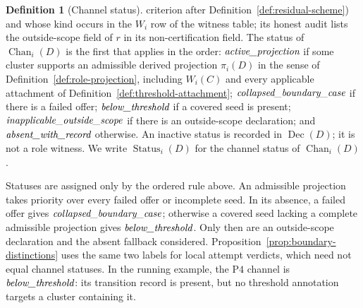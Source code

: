 \documentclass[11pt]{article}
\theoremstyle{definition}
\newtheorem{definition}[theorem]{Definition}
\newcommand{\Dec}[1]{\ensuremath{\operatorname{Dec}\!\left(#1\right)}}
\newcommand{\Chan}[2]{\ensuremath{\operatorname{Chan}_{#1}\!\left(#2\right)}}
\newcommand{\Status}[2]{\ensuremath{\operatorname{Status}_{#1}\!\left(#2\right)}}
\newcommand{\activeproj}{\textit{active\_\allowbreak projection}}
\newcommand{\belowthr}{\textit{below\_\allowbreak threshold}}
\newcommand{\collapsedbc}{\textit{collapsed\_\allowbreak boundary\_\allowbreak case}}
\newcommand{\absentrec}{\textit{absent\_\allowbreak with\_\allowbreak record}}
\newcommand{\outsidescope}{\textit{inapplicable\_\allowbreak outside\_\allowbreak scope}}
\newcommand{\Pfour}{\ensuremath{\mathrm{P4}}}
\begin{document}
\begin{definition}[Channel status]
criterion after Definition~\ref{def:residual-scheme}) and whose kind occurs in
the \(W_i\) row of the witness table; its honest audit lists the
outside-scope field of \(r\) in its non-certification field. The status of \(\Chan{i}{D}\) is the
first that applies in the order: \(\activeproj\) if some cluster supports
an admissible derived projection \(\pi_i(D)\) in the sense of
Definition~\ref{def:role-projection}, including \(W_i(C)\) and every
applicable attachment of Definition~\ref{def:threshold-attachment}; \(\collapsedbc\) if there is a
failed offer; \(\belowthr\) if a covered seed is present;
\(\outsidescope\) if there is an outside-scope declaration; and
\(\absentrec\) otherwise. An inactive status is recorded in \(\Dec{D}\); it
is not a role witness. We write \(\Status{i}{D}\) for the channel status of
\(\Chan{i}{D}\).
\end{definition}

Statuses are assigned only by the ordered rule above. An admissible
projection takes priority over every failed offer or incomplete seed. In its
absence, a failed offer gives \(\collapsedbc\); otherwise a covered seed
lacking a complete admissible projection gives \(\belowthr\). Only then are an
outside-scope declaration and the absent fallback considered.
Proposition~\ref{prop:boundary-distinctions} uses the same two labels for
local attempt verdicts, which need not equal channel statuses. In the running
example, the \Pfour{} channel is \(\belowthr\): its transition record is
present, but no threshold annotation targets a cluster containing it.
\end{document}
